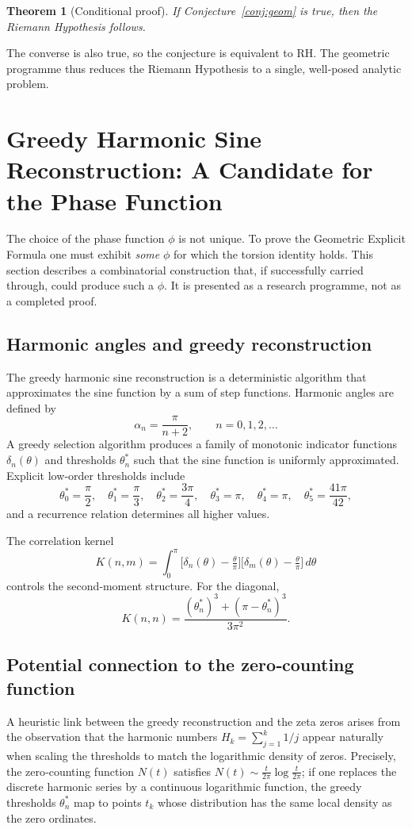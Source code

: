 \documentclass[11pt,a4paper]{article}
\newtheorem{theorem}{Theorem}[section]
\begin{document}
\begin{theorem}[Conditional proof]\label{thm:cond}
If Conjecture~\ref{conj:geom} is true, then the Riemann Hypothesis follows.
\end{theorem}

The converse is also true, so the conjecture is equivalent to RH.  The geometric programme thus reduces the Riemann Hypothesis to a single, well‑posed analytic problem.

\section{Greedy Harmonic Sine Reconstruction: A Candidate for the Phase Function}\label{sec:greedy}

The choice of the phase function \(\phi\) is not unique.  To prove the Geometric Explicit Formula one must exhibit \emph{some} \(\phi\) for which the torsion identity holds.  This section describes a combinatorial construction that, if successfully carried through, could produce such a \(\phi\).  It is presented as a research programme, not as a completed proof.

\subsection{Harmonic angles and greedy reconstruction}
The greedy harmonic sine reconstruction is a deterministic algorithm that approximates the sine function by a sum of step functions.  Harmonic angles are defined by
\[
\alpha_n = \frac{\pi}{n+2}, \qquad n = 0,1,2,\dots
\]
A greedy selection algorithm produces a family of monotonic indicator functions \(\delta_n(\theta)\) and thresholds \(\theta_n^*\) such that the sine function is uniformly approximated.  Explicit low‑order thresholds include
\[
\theta_0^* = \frac{\pi}{2},\quad \theta_1^* = \frac{\pi}{3},\quad \theta_2^* = \frac{3\pi}{4},\quad \theta_3^* = \pi,\quad \theta_4^* = \pi,\quad \theta_5^* = \frac{41\pi}{42},
\]
and a recurrence relation determines all higher values.

The correlation kernel
\[
K(n,m) = \int_0^\pi \bigl[ \delta_n(\theta) - \tfrac{\theta}{\pi} \bigr] \bigl[ \delta_m(\theta) - \tfrac{\theta}{\pi} \bigr] \, d\theta
\]
controls the second‑moment structure.  For the diagonal,
\[
K(n,n) = \frac{(\theta_n^*)^3 + (\pi - \theta_n^*)^3}{3\pi^2}.
\]

\subsection{Potential connection to the zero‑counting function}
A heuristic link between the greedy reconstruction and the zeta zeros arises from the observation that the harmonic numbers \(H_k = \sum_{j=1}^k 1/j\) appear naturally when scaling the thresholds to match the logarithmic density of zeros.  Precisely, the zero‑counting function \(N(t)\) satisfies \(N(t) \sim \frac{t}{2\pi}\log\frac{t}{2\pi}\); if one replaces the discrete harmonic series by a continuous logarithmic function, the greedy thresholds \(\theta_n^*\) map to points \(t_k\) whose distribution has the same local density as the zero ordinates.
\end{document}
